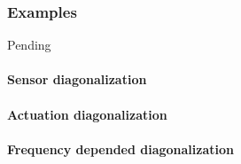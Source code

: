 \subsubsection{Examples}
Pending
\paragraph{Sensor diagonalization}
\paragraph{Actuation diagonalization}
\paragraph{Frequency depended diagonalization}
